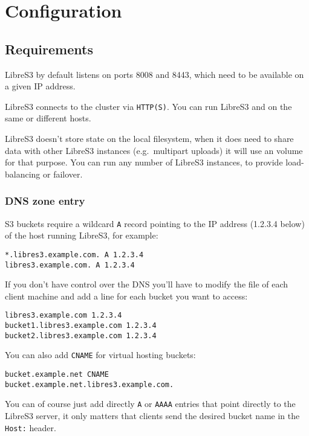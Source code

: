 \chapter{Configuration}

\section{Requirements}

LibreS3 by default listens on ports 8008 and 8443, which need to be available on a given
IP address.

LibreS3 connects to the \SX cluster via \verb|HTTP(S)|. You can run LibreS3 and \SX
on the same or different hosts.

LibreS3 doesn't store state on the local filesystem, when it does need to share
data with other LibreS3 instances (e.g.\ multipart uploads) it will use an \SX
volume for that purpose.
You can run any number of LibreS3 instances, to provide load-balancing or
failover.

\subsection{DNS zone entry}
\label{sec:dnszone}

S3 buckets require a wildcard \verb|A| record pointing to the IP address (1.2.3.4 below) of the
host running LibreS3, for example:

\begin{lstlisting}
*.libres3.example.com. A 1.2.3.4
libres3.example.com. A 1.2.3.4
\end{lstlisting}

If you don't have control over the DNS you'll have to modify the  file
of each client machine and add a line for each bucket you want to access:

\begin{lstlisting}
libres3.example.com 1.2.3.4
bucket1.libres3.example.com 1.2.3.4
bucket2.libres3.example.com 1.2.3.4
\end{lstlisting}

You can also add \verb|CNAME| for virtual hosting buckets:
\begin{lstlisting}
bucket.example.net CNAME        bucket.example.net.libres3.example.com.
\end{lstlisting}

You can of course just add directly \verb|A| or \verb|AAAA| entries that point
directly to the LibreS3 server, it only matters that
clients send the desired bucket name in the \verb|Host:| header.

